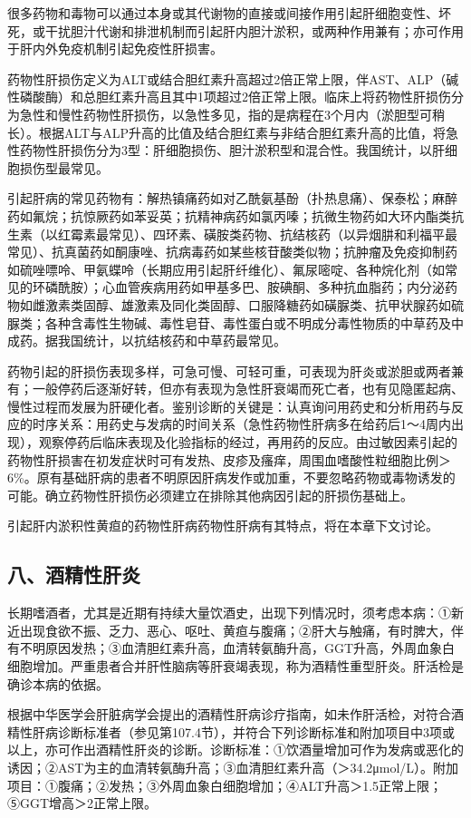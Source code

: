 很多药物和毒物可以通过本身或其代谢物的直接或间接作用引起肝细胞变性、坏死，或干扰胆汁代谢和排泄机制而引起肝内胆汁淤积，或两种作用兼有；亦可作用于肝内外免疫机制引起免疫性肝损害。

药物性肝损伤定义为ALT或结合胆红素升高超过2倍正常上限，伴AST、ALP（碱性磷酸酶）和总胆红素升高且其中1项超过2倍正常上限。临床上将药物性肝损伤分为急性和慢性药物性肝损伤，以急性多见，指的是病程在3个月内（淤胆型可稍长）。根据ALT与ALP升高的比值及结合胆红素与非结合胆红素升高的比值，将急性药物性肝损伤分为3型：肝细胞损伤、胆汁淤积型和混合性。我国统计，以肝细胞损伤型最常见。

引起肝病的常见药物有：解热镇痛药如对乙酰氨基酚（扑热息痛）、保泰松；麻醉药如氟烷；抗惊厥药如苯妥英；抗精神病药如氯丙嗪；抗微生物药如大环内酯类抗生素（以红霉素最常见）、四环素、磺胺类药物、抗结核药（以异烟肼和利福平最常见）、抗真菌药如酮康唑、抗病毒药如某些核苷酸类似物；抗肿瘤及免疫抑制药如硫唑嘌呤、甲氨蝶呤（长期应用引起肝纤维化）、氟尿嘧啶、各种烷化剂（如常见的环磷酰胺）；心血管疾病用药如甲基多巴、胺碘酮、多种抗血脂药；内分泌药物如雌激素类固醇、雄激素及同化类固醇、口服降糖药如磺脲类、抗甲状腺药如硫脲类；各种含毒性生物碱、毒性皂苷、毒性蛋白或不明成分毒性物质的中草药及中成药。据我国统计，以抗结核药和中草药最常见。

药物引起的肝损伤表现多样，可急可慢、可轻可重，可表现为肝炎或淤胆或两者兼有；一般停药后逐渐好转，但亦有表现为急性肝衰竭而死亡者，也有见隐匿起病、慢性过程而发展为肝硬化者。鉴别诊断的关键是：认真询问用药史和分析用药与反应的时序关系：用药史与发病的时间关系（急性药物性肝病多在给药后1～4周内出现），观察停药后临床表现及化验指标的经过，再用药的反应。由过敏因素引起的药物性肝损害在初发症状时可有发热、皮疹及瘙痒，周围血嗜酸性粒细胞比例＞6\%。原有基础肝病的患者不明原因肝病发作或加重，不要忽略药物或毒物诱发的可能。确立药物性肝损伤必须建立在排除其他病因引起的肝损伤基础上。

引起肝内淤积性黄疸的药物性肝病药物性肝病有其特点，将在本章下文讨论。

\subsection{八、酒精性肝炎}

长期嗜酒者，尤其是近期有持续大量饮酒史，出现下列情况时，须考虑本病：①新近出现食欲不振、乏力、恶心、呕吐、黄疸与腹痛；②肝大与触痛，有时脾大，伴有不明原因发热；③血清胆红素升高，血清转氨酶升高，GGT升高，外周血象白细胞增加。严重患者合并肝性脑病等肝衰竭表现，称为酒精性重型肝炎。肝活检是确诊本病的依据。

根据中华医学会肝脏病学会提出的酒精性肝病诊疗指南，如未作肝活检，对符合酒精性肝病诊断标准者（参见第107.4节），并符合下列诊断标准和附加项目中3项或以上，亦可作出酒精性肝炎的诊断。诊断标准：①饮酒量增加可作为发病或恶化的诱因；②AST为主的血清转氨酶升高；③血清胆红素升高（＞34.2μmol/L）。附加项目：①腹痛；②发热；③外周血象白细胞增加；④ALT升高＞1.5正常上限；⑤GGT增高＞2正常上限。

